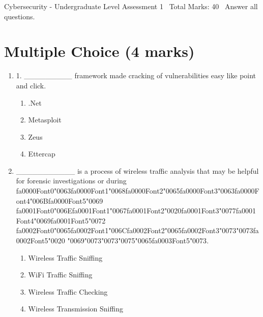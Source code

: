 \documentclass[12pt]{article}
\begin{document}
\begin{center}
Cybersecurity - Undergraduate Level Assessment 1 \
Total Marks: 40 \
Answer all questions.
\end{center}

\section*{Multiple Choice (4 marks)}
\begin{enumerate}[label=\arabic*.]
\item 1. \_\_\_\_\_\_\_\_\_ framework made cracking of vulnerabilities easy like point and click.
\begin{enumerate}[label=(\alph*)]
    \item .Net
    \item Metasploit
    \item Zeus
    \item Ettercap
\end{enumerate}
\item \_\_\_\_\_\_\_\_\_\_\_ is a process of wireless traffic analysis that may be helpful for forensic investigations or during {\csname fa0000Font0\endcsname\char"0063}{\csname fa0000Font1\endcsname\char"0068}{\csname fa0000Font2\endcsname\char"0065}{\csname fa0000Font3\endcsname\char"0063}{\csname fa0000Font4\endcsname\char"006B}{\csname fa0000Font5\endcsname\char"0069} {\csname fa0001Font0\endcsname\char"006E}{\csname fa0001Font1\endcsname\char"0067}{\csname fa0001Font2\endcsname\char"0020}{\csname fa0001Font3\endcsname\char"0077}{\csname fa0001Font4\endcsname\char"0069}{\csname fa0001Font5\endcsname\char"0072} {\csname fa0002Font0\endcsname\char"0065}{\csname fa0002Font1\endcsname\char"006C}{\csname fa0002Font2\endcsname\char"0065}{\csname fa0002Font3\endcsname\char"0073}{\char"0073}{\csname fa0002Font5\endcsname\char"0020} {\char"0069}{\char"0073}{\char"0073}{\char"0075}{\char"0065}{\csname fa0003Font5\endcsname\char"0073}.
\begin{enumerate}[label=(\alph*)]
    \item Wireless Traffic Sniffing
    \item WiFi Traffic Sniffing
    \item Wireless Traffic Checking
    \item Wireless Transmission Sniffing
\end{enumerate}
\end{enumerate}
\end{document}
